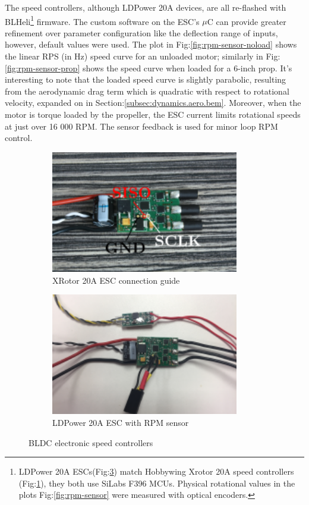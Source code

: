 \par
The speed controllers, although LDPower 20A devices, are all re-flashed with BLHeli\footnote{LDPower 20A ESCs(Fig:\ref{fig:ldpower-20A}) match Hobbywing Xrotor 20A speed controllers (Fig:\ref{fig:xrotor-20A}), they both use SiLabs F396 MCUs. Physical rotational values in the plots Fig:\ref{fig:rpm-sensor} were measured with optical encoders.}\cite{BLHeli} firmware. The custom software on the ESC's $\mu$C can provide greater refinement over parameter configuration like the deflection range of inputs, however, default values were used. The plot in Fig:\ref{fig:rpm-sensor-noload} shows the linear RPS (in Hz) speed curve for an unloaded motor; similarly in Fig:\ref{fig:rpm-sensor-prop} shows the speed curve when loaded for a 6-inch prop. It's interesting to note that the loaded speed curve is slightly parabolic, resulting from the aerodynamic drag term which is quadratic with respect to rotational velocity, expanded on in Section:\ref{subsec:dynamics.aero.bem}. Moreover, when the motor is torque loaded by the propeller, the ESC current limits rotational speeds at just over 16 000 RPM. The sensor feedback is used for minor loop RPM control.
\begin{figure}[hbtp]
\begin{subfigure}{0.5\textwidth}
\centering
\includegraphics[width=0.9\textwidth]{figs/xrotor-20A}
\caption{XRotor 20A ESC connection guide\cite{xrotor}}
\label{fig:xrotor-20A}
\end{subfigure}
\begin{subfigure}{0.5\textwidth}
\centering
\includegraphics[width=0.9\textwidth]{figs/ldpower-20A}
\caption{LDPower 20A ESC with RPM sensor}
\label{fig:ldpower-20A}
\end{subfigure}
\caption{BLDC electronic speed controllers}
\end{figure}
